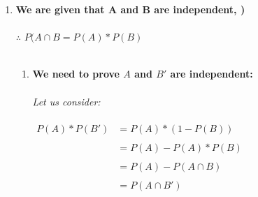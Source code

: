 \documentclass{article}
\begin{document}
\begin{enumerate}
\textbf{Now,}\\\\


$\begin{aligned}
     P(A_{1} \cap A_{2} \cap ... \cap A_{n}) &=  P(X \cap A_{n})\\\\
     &= P(A_n | B) * P(B)\hspace{10mm} --\textit{from [1]} \\\\
     &= P(A_n| P(A_{1} \cap A_{2} \cap ... \cap A_{n-1})) * P(A_{1} \cap A_{2} \cap ... \cap A_{n-1})\\\\
     &= P(A_1)*P(A_2|A_1)*P(A_3|A_1 \cap A_2)...P(A_n|A_1 ∩ A_2 ∩ .. ∩ A_n−1)\\\\
\end{aligned}$

\textbf{Hence Proved.}

\newpage
\item \large \textbf{We are given that A and B are independent, )}\\\\
$\therefore$ $P(A \cap B = P(A) * P(B)$\\\\

\begin{enumerate}
    \item \textbf{We need to prove $A$ and $B'$ are independent: }\\\\
    \textit{Let us consider: }\\\\
    $\begin{aligned}
        P(A)*P(B') &= P(A) * (1 - P(B))\\\\
        &= P(A) - P(A)*P(B)\\\\
        &= P(A) - P(A \cap B)\\\\
        &= P(A \cap B')\\\\
    \end{aligned}$


    \newpage


\end{enumerate}
\end{enumerate}
\end{document}

